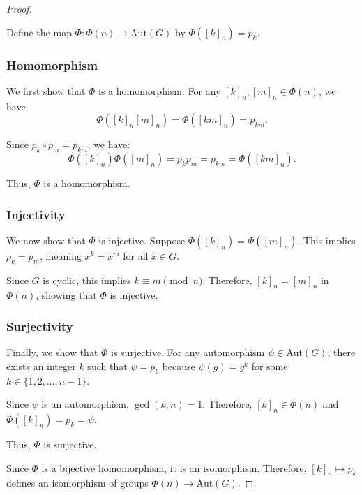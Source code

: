 \documentclass[12pt]{amsart}
\theoremstyle{definition}
\numberwithin{equation}{section}
\begin{document}
\begin{exercise}{5}
    \begin{proof} \( \)
    
    Define the map \(\Phi: \Phi(n) \rightarrow \text{Aut}(G)\) by \(\Phi([k]_n) = p_k\).
    
    \subsubsection*{Homomorphism}
    We first show that \(\Phi\) is a homomorphism. For any \([k]_n, [m]_n \in \Phi(n)\), we have:
    \[
    \Phi([k]_n [m]_n) = \Phi([km]_n) = p_{km}.
    \]
    
    Since \(p_k \circ p_m = p_{km}\), we have:
    \[
    \Phi([k]_n) \Phi([m]_n) = p_k p_m = p_{km} = \Phi([km]_n).
    \]
    
    Thus, \(\Phi\) is a homomorphism.
    
    \subsubsection*{Injectivity}
    We now show that \(\Phi\) is injective. Suppose \(\Phi([k]_n) = \Phi([m]_n)\). This implies \(p_k = p_m\), meaning \(x^k = x^m\) for all \(x \in G\).
    
    Since \(G\) is cyclic, this implies \(k \equiv m \pmod{n}\). Therefore, \([k]_n = [m]_n\) in \(\Phi(n)\), showing that \(\Phi\) is injective.
    
    \subsubsection*{Surjectivity}
    Finally, we show that \(\Phi\) is surjective. For any automorphism \(\psi \in \text{Aut}(G)\), there exists an integer \(k\) such that \(\psi = p_k\) because \(\psi(g) = g^k\) for some \(k \in \{1, 2, \ldots, n-1\}\).
    
    Since \(\psi\) is an automorphism, \(\gcd(k, n) = 1\). Therefore, \([k]_n \in \Phi(n)\) and \(\Phi([k]_n) = p_k = \psi\).
    
    Thus, \(\Phi\) is surjective.
    
    Since \(\Phi\) is a bijective homomorphism, it is an isomorphism. Therefore, \([k]_n \mapsto p_k\) defines an isomorphism of groups \(\Phi(n) \rightarrow \text{Aut}(G)\).
    
    \end{proof}
    
\begin{figure}[h!]
    \centering
\end{figure}
\end{exercise}
\end{document}
